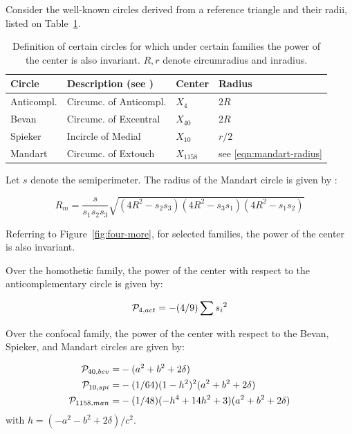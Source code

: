 Consider the well-known circles derived from a reference triangle and their radii, listed on Table~\ref{tab:four-more}.

\begin{table}
\begin{tabular}{|l|l|l|l|}
\hline
Circle & Description (see \cite{mw}) & Center & Radius\\
\hline
Anticompl. & Circumc. of Anticompl. & $X_{4}$ & $2R$\\
Bevan & Circumc. of Excentral & $X_{40}$ & $2R$ \\
Spieker & Incircle of Medial & $X_{10}$ & $r/2$ \\
Mandart & Circumc. of Extouch & $X_{1158}$ & see \eqref{eqn:mandart-radius} \\
\hline
\end{tabular}
\caption{Definition of certain circles for which under certain families the power of the center is also invariant. $R,r$ denote circumradius and inradius.}
\label{tab:four-more}
\end{table}

Let $s$ denote the semiperimeter. The radius of the Mandart circle is given by \cite[Mandart Circle]{mw}:

\begin{equation}
R_m=\frac{s}{s_1 s_2 s_3}\sqrt{(4R^2-s_2 s_3)(4 R^2-s_3 s_1)(4R^2-s_1 s_2)}
\label{eqn:mandart-radius}
\end{equation}

Referring to Figure~\ref{fig:four-more}, for selected families, the power of the center is also invariant.

\begin{proposition}
Over the homothetic family, the power of the center with respect to the anticomplementary circle is given by:

\[ \P_{4,act}= {-(4/9)\sum{s_i}^2}\]
\end{proposition}

\begin{proposition}
Over the confocal family, the power of the center with respect to the Bevan, Spieker, and Mandart circles are given by:

\begin{align*}
    \P_{40,bev}=& -(a^2+b^2+2\delta)\\
    \P_{10,spi}=& -(1/64)(1-h^2)^2(a^2+b^2+2\delta)\\
    \P_{1158,man}=& -(1/48)(-h^4+14h^2+3)(a^2+b^2+2\delta)
\end{align*}
with $h = ({-a^2-b^2+2\delta})/c^2$.
\end{proposition}



